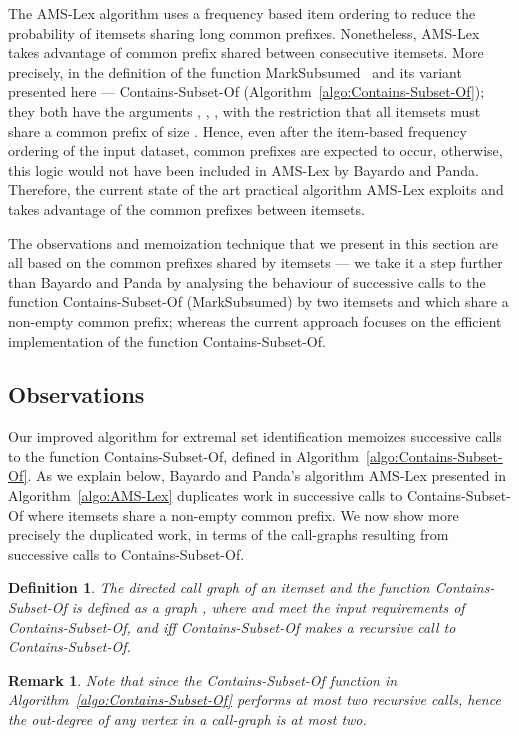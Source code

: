 \documentclass[13pt,a4paper]{article}
\newtheorem{definition}[theorem]{Definition}
\newtheorem{remark}[theorem]{Remark}
\begin{document}
The AMS-Lex \cite{BayardoPanda11} algorithm uses a frequency based item ordering to reduce the probability of itemsets sharing long common prefixes. Nonetheless, AMS-Lex takes advantage of common prefix shared between consecutive itemsets. More precisely, in the definition of the function MarkSubsumed~\cite{BayardoPanda11} and its variant presented here --- Contains-Subset-Of (Algorithm~\ref{algo:Contains-Subset-Of}); they both have the arguments , , ,  with the restriction that all itemsets  must share a common prefix of size . Hence, even after the item-based frequency ordering of the input dataset, common prefixes are expected to occur, otherwise, this logic would not have been included in AMS-Lex by Bayardo and Panda. Therefore, the current state of the art practical algorithm AMS-Lex exploits and takes advantage of the common prefixes between itemsets.

The observations and memoization technique that we present in this section are all based on the common prefixes shared by itemsets --- we take it a step further than Bayardo and Panda by analysing the behaviour of successive calls to the function Contains-Subset-Of (MarkSubsumed) by two itemsets  and  which share a non-empty common prefix; whereas the current approach \cite{BayardoPanda11} focuses on the efficient implementation of the function Contains-Subset-Of.

\subsection{Observations}
Our improved algorithm for extremal set identification memoizes successive calls to the function Contains-Subset-Of, defined in Algorithm~\ref{algo:Contains-Subset-Of}. As we explain below, Bayardo and Panda's algorithm AMS-Lex presented in Algorithm~\ref{algo:AMS-Lex} duplicates work in successive calls to Contains-Subset-Of where itemsets share a non-empty common prefix. We now show more precisely the duplicated work, in terms of the call-graphs resulting from successive calls to Contains-Subset-Of.

\begin{definition}
\label{def:call_graph}
The directed call graph of an itemset  and the function Contains-Subset-Of is defined as a graph , where  and  meet the input requirements of Contains-Subset-Of, and  iff Contains-Subset-Of makes a recursive call to Contains-Subset-Of.
\end{definition}

\begin{remark}
\label{RemarkOutDegreeOfGraph}
Note that since the Contains-Subset-Of function in Algorithm~\ref{algo:Contains-Subset-Of} performs at most two recursive calls, hence the out-degree of any vertex in a call-graph  is at most two. 
\end{remark}
\end{document}
